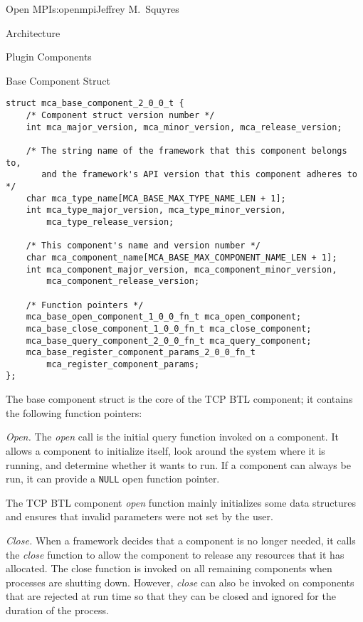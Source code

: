 \begin{aosachapter}{Open MPI}{s:openmpi}{Jeffrey M.\ Squyres}
\begin{aosasect1}{Architecture}
\begin{aosasect2}{Plugin Components}
\begin{aosabox}{Base Component Struct}
\begin{verbatim}
struct mca_base_component_2_0_0_t {
    /* Component struct version number */
    int mca_major_version, mca_minor_version, mca_release_version;

    /* The string name of the framework that this component belongs to,
       and the framework's API version that this component adheres to */
    char mca_type_name[MCA_BASE_MAX_TYPE_NAME_LEN + 1];
    int mca_type_major_version, mca_type_minor_version,  
        mca_type_release_version;

    /* This component's name and version number */
    char mca_component_name[MCA_BASE_MAX_COMPONENT_NAME_LEN + 1];
    int mca_component_major_version, mca_component_minor_version,
        mca_component_release_version;

    /* Function pointers */  
    mca_base_open_component_1_0_0_fn_t mca_open_component;
    mca_base_close_component_1_0_0_fn_t mca_close_component;
    mca_base_query_component_2_0_0_fn_t mca_query_component;
    mca_base_register_component_params_2_0_0_fn_t 
        mca_register_component_params;
};
\end{verbatim}
\end{aosabox}

The base component struct is the core of the TCP BTL component; it
contains the following function pointers:

\begin{aosaitemize}
\item \emph{Open.} The \emph{open} call is the initial query function
  invoked on a component.  It allows a component to initialize itself,
  look around the system where it is running, and determine whether it
  wants to run.  If a component can always be run, it can provide a
  {\tt NULL} open function pointer.

  The TCP BTL component \emph{open} function mainly initializes some
  data structures and ensures that invalid parameters were not set by
  the user.

\item \emph{Close.} When a framework decides that a component is no
  longer needed, it calls the \emph{close} function to allow the
  component to release any resources that it has allocated.  The close
  function is invoked on all remaining components when processes are
  shutting down.  However, \emph{close} can also be invoked on
  components that are rejected at run time so that they can be closed
  and ignored for the duration of the process.


\end{aosaitemize}
\end{aosasect2}
\end{aosasect1}
\end{aosachapter}

